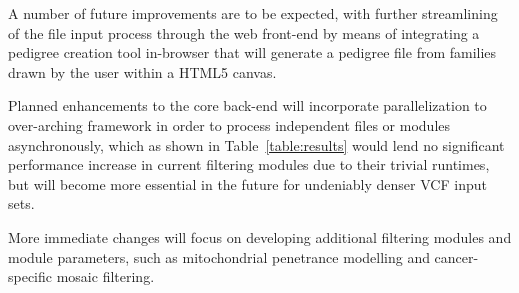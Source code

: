 A number of future improvements are to be expected, with further streamlining of the file input process through the web front-end by means of integrating a pedigree creation tool in-browser that will generate a pedigree file from families drawn by the user within a HTML5 canvas.

Planned enhancements to the core \app back-end will incorporate parallelization to over-arching framework in order to process independent files or modules asynchronously, which as shown in Table~\ref{table:results} would lend no significant performance increase in current filtering modules due to their trivial runtimes, but will become more essential in the future for undeniably denser VCF input sets.

More immediate changes will focus on developing additional filtering modules and module parameters, such as mitochondrial penetrance modelling and cancer-specific mosaic filtering.

